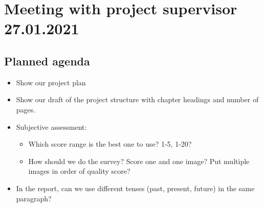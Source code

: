 \newpage

\section*{Meeting with project supervisor 27.01.2021}
\subsection*{Planned agenda}
\begin{itemize}
\item Show our project plan
\item Show our draft of the project structure with chapter headings and number of pages.
\item Subjective assessment: 
    \begin{itemize}
    \item Which score range is the best one to use? 1-5, 1-20?
    \item How should we do the survey? Score one and one image? Put multiple images in order of quality score?
    \end{itemize}
\item In the report, can we use different tenses (past, present, future) in the same paragraph?
\end{itemize}

